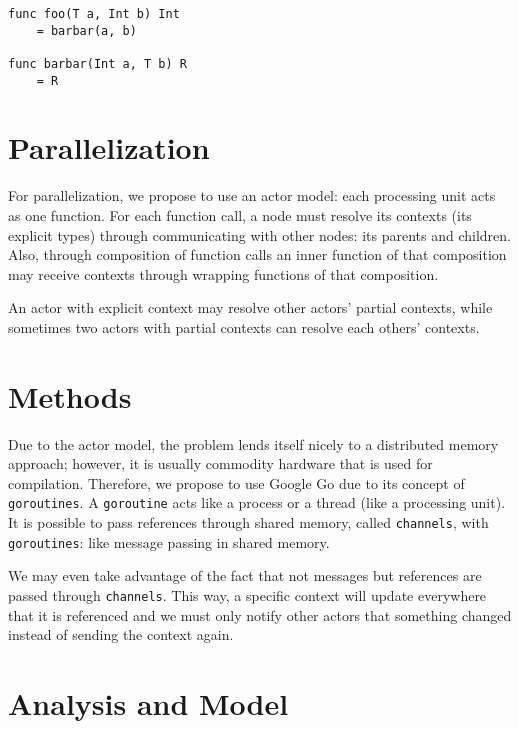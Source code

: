 \documentclass{acm_proc_article-sp}
\begin{document}
\begin{lstlisting}[caption=Explicit Context Provided by Child and Parent,style=paratype]
func foo(T a, Int b) Int
    = barbar(a, b)

func barbar(Int a, T b) R
    = R
\end{lstlisting}

\section{Parallelization}

For parallelization, we propose to use an actor model: each processing unit
acts as one function. For each function call, a node must resolve its contexts
(its explicit types) through communicating with other nodes: its parents and
children. Also, through composition of function calls an inner function of that
composition may receive contexts through wrapping functions of that
composition.

An actor with explicit context may resolve other actors' partial contexts,
while sometimes two actors with partial contexts can resolve each others'
contexts.


\section{Methods}


Due to the actor model, the problem lends itself nicely to a distributed memory
approach; however, it is usually commodity hardware that is used for
compilation. Therefore, we propose to use Google Go due to its concept of
\texttt{goroutines}. A \texttt{goroutine} acts like a process or a thread (like
a processing unit). It is possible to pass references through shared memory,
called \texttt{channels}, with \texttt{goroutines}: like message passing in
shared memory.

We may even take advantage of the fact that not messages but references are
passed through \texttt{channels}. This way, a specific context will update
everywhere that it is referenced and we must only notify other actors that
something changed instead of sending the context again.


\section{Analysis and Model}
\end{document}
